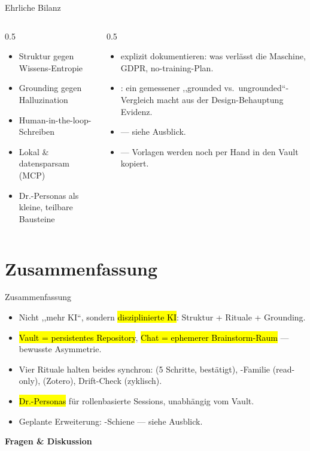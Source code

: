 \documentclass[aspectratio=169,11pt]{beamer}
\begin{document}
\begin{frame}{Ehrliche Bilanz}
  \begin{columns}[T]
    \begin{column}{0.5\textwidth}
      \begin{itemize}
        \item Struktur gegen Wissens-Entropie
        \item Grounding gegen Halluzination
        \item Human-in-the-loop-Schreiben
        \item Lokal \& datensparsam (MCP)
        \item Dr.-Personas als kleine, teilbare Bausteine
      \end{itemize}
    \end{column}
    \begin{column}{0.5\textwidth}
      \begin{itemize}
        \item {} explizit dokumentieren:
              was verlässt die Maschine, GDPR, no-training-Plan.
        \item {}: ein gemessener
              ,,grounded vs.\ ungrounded``-Vergleich macht aus der
              Design-Behauptung Evidenz.
        \item {} --- siehe Ausblick.
        \item {} --- Vorlagen werden noch
              per Hand in den Vault kopiert.
      \end{itemize}
    \end{column}
  \end{columns}
\end{frame}

\section{Zusammenfassung}

\begin{frame}{Zusammenfassung}
  \begin{itemize}
    \item Nicht ,,mehr KI``, sondern \hl{disziplinierte KI}:
          Struktur + Rituale + Grounding.
    \item \hl{Vault = persistentes Repository}, \hl{Chat = ephemerer
          Brainstorm-Raum} --- bewusste Asymmetrie.
    \item Vier Rituale halten beides synchron:  (5 Schritte,
          bestätigt), -Familie (read-only), 
          (Zotero), Drift-Check (zyklisch).
    \item \hl{Dr.-Personas} für rollenbasierte Sessions, unabhängig vom
          Vault.
    \item Geplante Erweiterung: -Schiene --- siehe Ausblick.
  \end{itemize}
  \vfill
  \begin{center}
    {\large\color{hhnblue}\textbf{Fragen \& Diskussion}}
  \end{center}
\end{frame}
\end{document}
